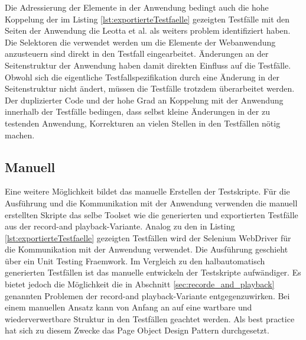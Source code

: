 Die Adressierung der Elemente in der Anwendung bedingt auch die hohe Koppelung der im Listing \ref{lst:exportierteTestfaelle} gezeigten Testfälle mit den Seiten der Anwendung die Leotta et al. \cite{leotta_repairing_2013} als weiters problem identifiziert haben. Die Selektoren die verwendet werden um die Elemente der Webanwendung anzusteuern sind direkt in den Testfall eingearbeitet. Änderungen an der Seitenstruktur der Anwendung haben damit direkten Einfluss auf die Testfälle.\\
Obwohl sich die eigentliche Testfallspezifikation durch eine Änderung in der Seitenstruktur nicht ändert, müssen die Testfälle trotzdem überarbeitet werden.
Der duplizierter Code und der hohe Grad an Koppelung mit der Anwendung innerhalb der Testfälle bedingen, dass selbst kleine Änderungen in der zu testenden Anwendung, Korrekturen an vielen Stellen in den Testfällen nötig machen.

\subsection{Manuell}
\label{sec:manuell}
Eine weitere Möglichkeit bildet das manuelle Erstellen der Testskripte. Für die Ausführung und die Kommunikation mit der Anwendung verwenden die manuell erstellten Skripte das selbe Toolset wie die generierten und exportierten Testfälle aus der \grq record-and playback\grq -Variante. Analog zu den in Listing \ref{lst:exportierteTestfaelle} gezeigten Testfällen wird der Selenium WebDriver für die Kommunikation mit der Anwendung verwendet. Die Ausführung geschieht über ein Unit Testing Fraemwork.
Im Vergleich zu den halbautomatisch generierten Testfällen ist das manuelle entwickeln der Testskripte aufwändiger.
Es bietet jedoch die Möglichkeit die in Abschnitt \ref{sec:recorde_and_playback} genannten Problemen der \grq record-and playback\grq -Variante entgegenzuwirken.
Bei einem manuellen Ansatz kann von Anfang an auf eine wartbare und wiederverwertbare Struktur in den Testfällen geachtet werden.
Als best practice hat sich zu diesem Zwecke das Page Object Design Pattern durchgesetzt.

